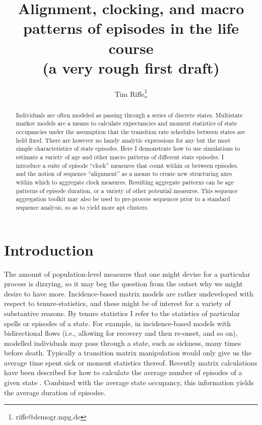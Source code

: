 \documentclass{article}
\begin{document}
\title{Alignment, clocking, and macro patterns of episodes in the life course \\ (a very rough first draft)}
\author[1]{Tim Riffe\thanks{riffe@demogr.mpg.de}}
\maketitle

\begin{abstract}
Individuals are often modeled as passing through a series of discrete
states. Multistate markov models are a means to calculate expectancies and
moment statistics of state occupancies under the assumption that the transition
rate schedules between states are held fixed. There are however no handy
analytic expressions for any but the most simple characteristics of state episodes. Here
I demonstrate how to use simulations to estimate a variety of age and other
macro patterns of different state episodes. I introduce a
suite of episode ``clock'' measures that count within or between episodes, and the notion of
sequence ``alignment'' as a means to create new structuring axes within which to
aggregate clock measures. Resulting aggregate patterns can be age patterns of
episode duration, or a variety of other potential measures. This sequence
aggregation toolkit may also be used to pre-process sequences prior to a
standard sequence analysis, so as to yield more apt clusters. 
\end{abstract}

\section{Introduction}
The amount of population-level measures that one might devise for a particular
process is dizzying, so it may beg the question from the outset
why we might desire to have more. Incidence-based matrix
models are rather undeveloped with respect to tenure-statistics, and these
might be of interest for a variety of substantive reasons. By tenure statistics I
refer to the statistics of particular spells or episodes of a state. For
example, in incidence-based models with bidirectional flows (i.e., allowing for
recovery and then re-onset, and so on), modelled individuals may pass through a state,
such as sickness, many times before death. Typically a transition matrix
manipulation would only give us the average time spent sick or moment statistics
thereof. Recently matrix calculations have been described for how to calculate the average number of episodes of a given state \citep{dudel2017b}.
Combined with the average state occupancy, this information yields the average
duration of episodes.
\end{document}
